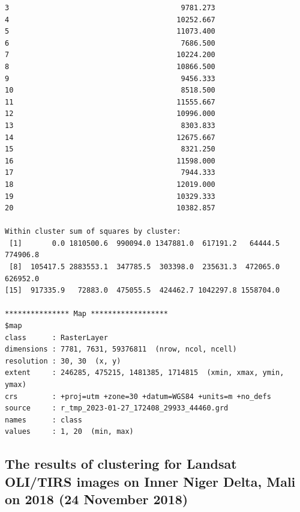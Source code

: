 \documentclass[12pt,a4paper,oneside]{article}
\begin{document}
\begin{scriptsize}
\begin{verbatim}
3                                        9781.273
4                                       10252.667
5                                       11073.400
6                                        7686.500
7                                       10224.200
8                                       10866.500
9                                        9456.333
10                                       8518.500
11                                      11555.667
12                                      10996.000
13                                       8303.833
14                                      12675.667
15                                       8321.250
16                                      11598.000
17                                       7944.333
18                                      12019.000
19                                      10329.333
20                                      10382.857

Within cluster sum of squares by cluster:
 [1]       0.0 1810500.6  990094.0 1347881.0  617191.2   64444.5  774906.8
 [8]  105417.5 2883553.1  347785.5  303398.0  235631.3  472065.0  626952.0
[15]  917335.9   72883.0  475055.5  424462.7 1042297.8 1558704.0

*************** Map ******************
$map
class      : RasterLayer 
dimensions : 7781, 7631, 59376811  (nrow, ncol, ncell)
resolution : 30, 30  (x, y)
extent     : 246285, 475215, 1481385, 1714815  (xmin, xmax, ymin, ymax)
crs        : +proj=utm +zone=30 +datum=WGS84 +units=m +no_defs 
source     : r_tmp_2023-01-27_172408_29933_44460.grd 
names      : class 
values     : 1, 20  (min, max)
\end{verbatim}
\end{scriptsize}

\subsection*{The results of clustering for Landsat OLI/TIRS images on Inner Niger Delta, Mali on 2018 (24 November 2018)}
\end{document}
